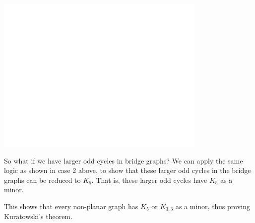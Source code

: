 \includegraphics[height = 3in]{white.png}

So what if we have larger odd cycles in bridge graphs? We can apply the same logic as shown in case 2 above, to show that these larger odd cycles in the bridge graphs can be reduced to $K_5$. That is, these larger odd cycles have $K_5$ as a minor.
	
This shows that every non-planar graph has $K_5$ or $K_{3,3}$ as a minor, thus proving Kuratowski's theorem.




